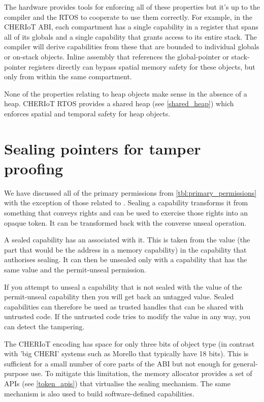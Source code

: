 The hardware provides tools for enforcing all of these properties but it's up to the compiler and the RTOS to cooperate to use them correctly.
For example, in the CHERIoT ABI, each compartment has a single capability in a register that spans all of its globals and a single capability that grants access to its entire stack.
The compiler will derive capabilities from these that are bounded to individual globals or on-stack objects.
Inline assembly that references the global-pointer or stack-pointer registers directly can bypass spatial memory safety for these objects, but only from within the same compartment.

None of the properties relating to heap objects make sense in the absence of a heap.
CHERIoT RTOS provides a shared heap (see \ref{shared_heap}) which enforces spatial and temporal safety for heap objects.

\section[label=sealing_intro]{Sealing pointers for tamper proofing}

We have discussed all of the primary permissions from \ref{tbl:primary_permissions} with the exception of those related to .
Sealing a capability transforms it from something that conveys rights and can be used to exercise those rights into an opaque token.
It can be transformed back with the converse unseal operation.

A sealed capability has an  associated with it.
This is taken from the value (the part that would be the address in a memory capability) in the capability that authorises sealing.
It can then be unsealed only with a capability that has the same value and the permit-unseal permission.

If you attempt to unseal a capability that is not sealed with the value of the permit-unseal capability then you will get back an untagged value.
Sealed capabilities can therefore be used as trusted handles that can be shared with untrusted code.
If the untrusted code tries to modify the value in any way, you can detect the tampering.

The CHERIoT encoding has space for only three bits of object type (in contrast with 'big CHERI' systems such as Morello that typically have 18 bits).
This is sufficient for a small number of core parts of the ABI but not enough for general-purpose use.
To mitigate this limitation, the memory allocator provides a set of APIs (see \ref{token_apis}) that virtualise the sealing mechanism.
The same mechanism is also used to build software-defined capabilities.

